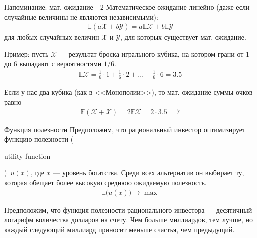 \documentclass{beamer}
\newcommand{\en}[1]{\begin{otherlanguage}{english}#1\end{otherlanguage}}
\begin{document}
\begin{frame}{Напоминание: мат. ожидание - 2}
\justify
Математическое ожидание линейно (даже если случайные величины не являются 
независимыми):
\begin{align*}
\mathbb{E}(a\mathcal{X} + b\mathcal{Y}) =
a\mathbb{E}\mathcal{X} + b\mathbb{E}\mathcal{Y}
\end{align*}
для любых случайных величин $\mathcal{X}$ и $\mathcal{Y}$, для которых 
существует мат. ожидание.

\justify
Пример: пусть $\mathcal{X}$ --- результат броска игрального кубика, на котором 
грани от 1 до 6 выпадают с вероятностями $1/6$.
\begin{align*}
\mathbb{E}\mathcal{X} =
\frac{1}{6} \cdot 1 + \frac{1}{6} \cdot 2 + ... + \frac{1}{6} \cdot 6 = 3.5
\end{align*}

\justify
Если у нас два кубика (как в <<Монополии>>), то мат. ожидание суммы очков равно
\begin{align*}
\mathbb{E}(\mathcal{X} + \mathcal{X})
= 2\mathbb{E}\mathcal{X}
= 2 \cdot 3.5 = 7
\end{align*}
\end{frame}



\begin{frame}{Функция полезности}
\justify
Предположим, что рациональный инвестор оптимизирует функцию полезности (\en{
utility function})\ $u(x)$, где $x$ --- уровень богатства. Среди всех 
альтернатив он выбирает ту, которая обещает более высокую среднюю ожидаемую
полезность.
\begin{align*}
\mathbb{E}\Big(u(x)\Big) \to \max
\end{align*}

\justify
Предположим, что функция полезности рационального инвестора --- десятичный 
логарифм количества долларов на счету. Чем больше миллиардов, тем лучше, но 
каждый следующий миллиард приносит меньше счастья, чем предыдущий.
\end{frame}
\end{document}
